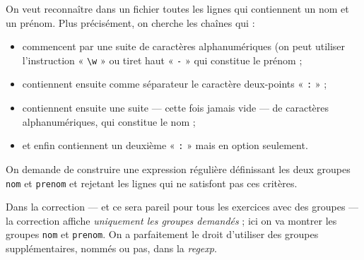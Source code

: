 \begin{exercise}[title=Lignes avec nom et prénom, level=intermediate]
On veut reconnaître dans un fichier toutes les lignes qui contiennent un nom et un prénom.
Plus précisément, on cherche les chaînes qui :
\begin{itemize}
\item commencent par une suite de caractères alphanumériques (on peut utiliser l'instruction « \texttt{\textbackslash{w}} » ou tiret haut « \texttt{-} » qui constitue le prénom ;
\item contiennent ensuite comme séparateur le caractère deux-points « \texttt{:} » ;
\item contiennent ensuite une suite --- cette fois jamais vide --- de caractères alphanumériques, qui constitue le nom ;
\item et enfin contiennent un deuxième « \texttt{:} » mais en option seulement.
\end{itemize}


On demande de construire une expression régulière définissant les deux groupes \texttt{nom} et \texttt{prenom} et rejetant les lignes qui ne satisfont pas ces critères.

Dans la correction --- et ce sera pareil pour tous les exercices avec des groupes --- la correction affiche \emph{uniquement les groupes demandés} ; ici on va montrer les groupes \texttt{nom} et \texttt{prenom}. On a parfaitement le droit d'utiliser des groupes supplémentaires, nommés ou pas, dans la \textit{regexp}.
\end{exercise}

